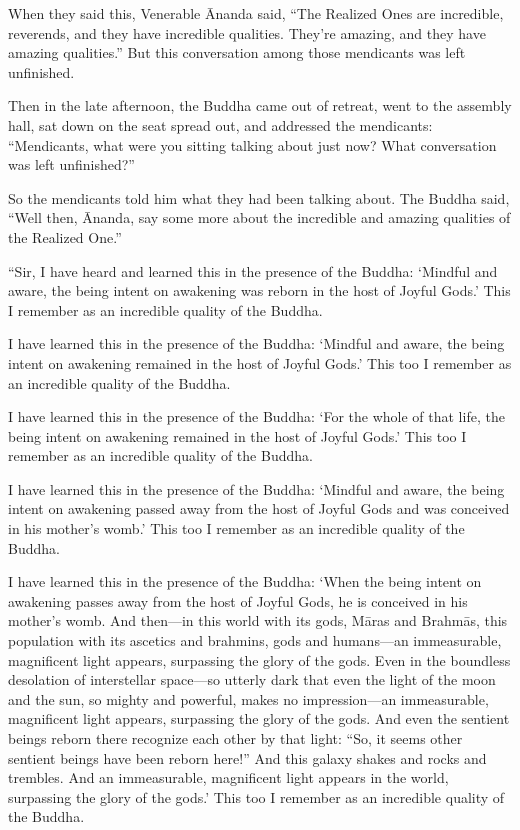 \documentclass[12pt,openany]{book}%
\begin{document}
When they said this, Venerable Ānanda said, “The Realized Ones are incredible, reverends, and they have incredible qualities. They’re amazing, and they have amazing qualities.” But this conversation among those mendicants was left unfinished. 

Then in the late afternoon, the Buddha came out of retreat, went to the assembly hall, sat down on the seat spread out, and addressed the mendicants: “Mendicants, what were you sitting talking about just now? What conversation was left unfinished?” 

So the mendicants told him what they had been talking about. The Buddha said, “Well then, Ānanda, say some more about the incredible and amazing qualities of the Realized One.” 

“Sir, I have heard and learned this in the presence of the Buddha: ‘Mindful and aware, the being intent on awakening was reborn in the host of Joyful Gods.’ This I remember as an incredible quality of the Buddha. 

I have learned this in the presence of the Buddha: ‘Mindful and aware, the being intent on awakening remained in the host of Joyful Gods.’ This too I remember as an incredible quality of the Buddha. 

I have learned this in the presence of the Buddha: ‘For the whole of that life, the being intent on awakening remained in the host of Joyful Gods.’ This too I remember as an incredible quality of the Buddha. 

I have learned this in the presence of the Buddha: ‘Mindful and aware, the being intent on awakening passed away from the host of Joyful Gods and was conceived in his mother’s womb.’ This too I remember as an incredible quality of the Buddha. 

I have learned this in the presence of the Buddha: ‘When the being intent on awakening passes away from the host of Joyful Gods, he is conceived in his mother’s womb. And then—in this world with its gods, \textsanskrit{Māras} and \textsanskrit{Brahmās}, this population with its ascetics and brahmins, gods and humans—an immeasurable, magnificent light appears, surpassing the glory of the gods. Even in the boundless desolation of interstellar space—so utterly dark that even the light of the moon and the sun, so mighty and powerful, makes no impression—an immeasurable, magnificent light appears, surpassing the glory of the gods. And even the sentient beings reborn there recognize each other by that light: “So, it seems other sentient beings have been reborn here!” And this galaxy shakes and rocks and trembles. And an immeasurable, magnificent light appears in the world, surpassing the glory of the gods.’ This too I remember as an incredible quality of the Buddha. 
\end{document}
